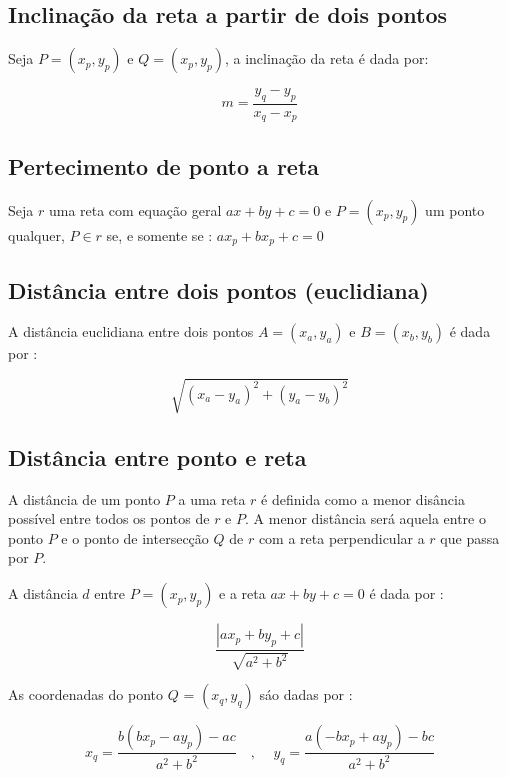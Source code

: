 \subsection{Inclinação da reta a partir de dois pontos}

Seja $P = (x_p, y_p)$ e $Q = (x_p, y_p)$, a inclinação da reta é dada por:

\begin{equation}
    m = \frac{y_q - y_p}{x_q - x_p}
\end{equation}

\subsection{Pertecimento de ponto a reta}

Seja $r$ uma reta com equação geral $ax + by + c = 0$ e $P = (x_p, y_p) $ um ponto qualquer, $P \in r$ se, e somente se : $a x_p + b x_p + c = 0$

\subsection{Distância entre dois pontos (euclidiana)}

A distância euclidiana entre dois pontos $A = (x_a, y_a)$ e $B = (x_b, y_b)$ é dada por :

$$ \sqrt{(x_a-y_a)^2 + (y_a-y_b)^2} $$

\subsection{Distância entre ponto e reta}

A distância de um ponto $P$ a uma reta $r$ é definida como a menor disância possível entre todos os pontos de $r$ e $P$. A menor distância será aquela entre o ponto $P$ e o ponto de intersecção $Q$ de $r$ com a reta perpendicular a $r$ que passa por $P$.

A distância $d$ entre $P = (x_p, y_p)$ e a reta $ax + by + c = 0$ é dada por :

\begin{equation}
    \frac{|a x_p + b y_p +c|}{\sqrt{a^2+b^2}}
\end{equation}

As coordenadas do ponto $Q$ = $(x_q, y_q)$ sáo dadas por : 

\begin{equation}
x_q = \frac{b (b x_p - a y_p)-ac}{a^2+b^2} \quad \text{, } \quad y_q = \frac{a(-bx_p+ay_p)-bc}{a^2+b^2}
\end{equation}


